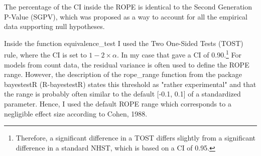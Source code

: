 The percentage of the CI inside the ROPE is identical to the Second Generation P-Value (SGPV), which was proposed %
 as a way to account for all the empirical data supporting null hypotheses. %


Inside the function equivalence\_test I used the Two One-Sided Tests (TOST) rule, where the CI is set to $1 - 2\times \alpha$. In my case that gave a CI of 0.90.\footnote{Therefore, a significant difference in a TOST differs slightly from a significant difference in a standard NHST, which is based on a CI of 0.95.}
For models from count data, the residual variance is often used to define the ROPE range. However, the description of the rope\_range function from the package bayestestR (R-bayestestR) states this threshold as "rather experimental" and that the range is probably often similar to the default [-0.1, 0.1] of a standardized parameter.
Hence, I used the default ROPE range which corresponds to a negligible effect size according to Cohen, 1988.











